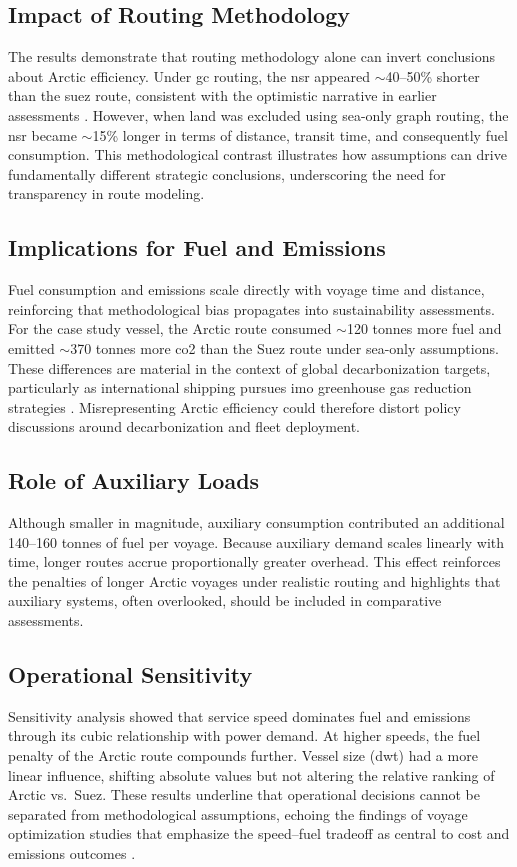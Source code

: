 \subsection{Impact of Routing Methodology}
The results demonstrate that routing methodology alone can invert conclusions about Arctic efficiency. Under \ac{gc} routing, the \ac{nsr} appeared $\sim$40--50\% shorter than the \ac{suez} route, consistent with the optimistic narrative in earlier assessments \citep{LiuKronbak2010,SchoyenBrathen2011,Yumashev2017}. However, when land was excluded using sea-only graph routing, the \ac{nsr} became $\sim$15\% longer in terms of distance, transit time, and consequently fuel consumption. This methodological contrast illustrates how assumptions can drive fundamentally different strategic conclusions, underscoring the need for transparency in route modeling.

\subsection{Implications for Fuel and Emissions}
Fuel consumption and emissions scale directly with voyage time and distance, reinforcing that methodological bias propagates into sustainability assessments. For the case study vessel, the Arctic route consumed $\sim$120 tonnes more fuel and emitted $\sim$370 tonnes more \ac{co2} than the Suez route under sea-only assumptions. These differences are material in the context of global decarbonization targets, particularly as international shipping pursues \ac{imo} greenhouse gas reduction strategies \citep{IMO2009,Bazari2013}. Misrepresenting Arctic efficiency could therefore distort policy discussions around decarbonization and fleet deployment.

\subsection{Role of Auxiliary Loads}
Although smaller in magnitude, auxiliary consumption contributed an additional 140--160 tonnes of fuel per voyage. Because auxiliary demand scales linearly with time, longer routes accrue proportionally greater overhead. This effect reinforces the penalties of longer Arctic voyages under realistic routing and highlights that auxiliary systems, often overlooked, should be included in comparative assessments.

\subsection{Operational Sensitivity}
Sensitivity analysis showed that service speed dominates fuel and emissions through its cubic relationship with power demand. At higher speeds, the fuel penalty of the Arctic route compounds further. Vessel size (\ac{dwt}) had a more linear influence, shifting absolute values but not altering the relative ranking of Arctic vs.\ Suez. These results underline that operational decisions cannot be separated from methodological assumptions, echoing the findings of voyage optimization studies that emphasize the speed–fuel tradeoff as central to cost and emissions outcomes \citep{Kontovas2014,Psaraftis2019}.

